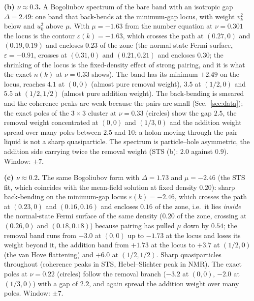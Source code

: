 \documentclass[11pt]{article}
\newcommand{\nut}{\nu\approx0.3}
\newcommand{\nutw}{\nu\approx0.2}
\begin{document}
\textbf{(b) $\nut$.} A Bogoliubov spectrum of the bare band with an isotropic gap $\Delta=2.49$: one band that back-bends at the minimum-gap locus, with weight $v_k^2$ below and $u_k^2$ above $\mu$. With $\mu=-1.63$ from the number equation at $\nu=0.301$ the locus is the contour $\varepsilon(k)=-1.63$, which crosses the path at $(0.27,0)$ and $(0.19,0.19)$ and encloses $0.23$ of the zone (the normal-state Fermi surface, $\varepsilon=-0.91$, crosses at $(0.31,0)$ and $(0.21,0.21)$ and encloses $0.30$; the shrinking of the locus is the fixed-density effect of strong pairing, and it is what the exact $n(k)$ at $\nu=0.33$ shows). The band has its minimum $\pm2.49$ on the locus, reaches $4.1$ at $(0,0)$ (almost pure removal weight), $3.5$ at $(1/2,0)$ and $5.5$ at $(1/2,1/2)$ (almost pure addition weight). The back-bending is smeared and the coherence peaks are weak because the pairs are small (Sec.~\ref{sec:data}); the exact poles of the $3\times3$ cluster at $\nu=0.33$ (circles) show the gap $2.5$, the removal weight concentrated at $(0,0)$ and $(1/3,0)$ and the addition weight spread over many poles between $2.5$ and $10$: a holon moving through the pair liquid is not a sharp quasiparticle. The spectrum is particle--hole asymmetric, the addition side carrying twice the removal weight (STS (b): $2.0$ against $0.9$). Window: $\pm7$.

\textbf{(c) $\nutw$.} The same Bogoliubov form with $\Delta=1.73$ and $\mu=-2.46$ (the STS fit, which coincides with the mean-field solution at fixed density $0.20$): sharp back-bending on the minimum-gap locus $\varepsilon(k)=-2.46$, which crosses the path at $(0.23,0)$ and $(0.16,0.16)$ and encloses $0.16$ of the zone, i.e.\ it lies \emph{inside} the normal-state Fermi surface of the same density ($0.20$ of the zone, crossing at $(0.26,0)$ and $(0.18,0.18)$) because pairing has pulled $\mu$ down by $0.54$; the removal band runs from $-3.0$ at $(0,0)$ up to $-1.73$ at the locus and loses its weight beyond it, the addition band from $+1.73$ at the locus to $+3.7$ at $(1/2,0)$ (the van Hove flattening) and $+6.0$ at $(1/2,1/2)$. Sharp quasiparticles throughout (coherence peaks in STS, Hebel--Slichter peak in NMR). The exact poles at $\nu=0.22$ (circles) follow the removal branch ($-3.2$ at $(0,0)$, $-2.0$ at $(1/3,0)$) with a gap of $2.2$, and again spread the addition weight over many poles. Window: $\pm7$.
\end{document}
